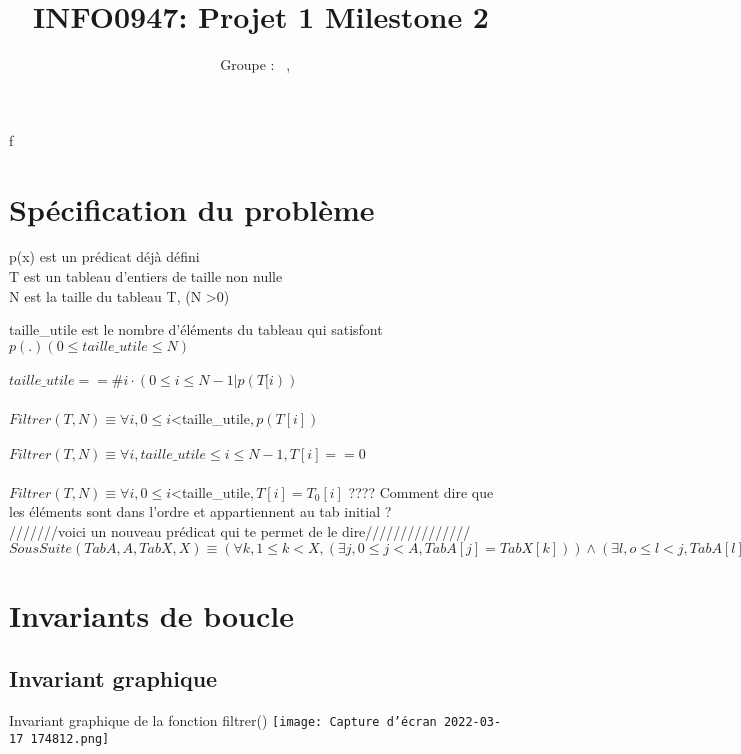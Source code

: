 f\documentclass[a4paper, 11pt, oneside]{article}
\title{INFO0947: Projet 1 Milestone 2}
\author{Groupe \GrNbr : \PrenomUN~\textsc{\NomUN}, \PrenomDEUX~\textsc{\NomDEUX}}
\date{}
\begin{document}
\maketitle


\section{Spécification du problème}


p(x) est un prédicat déjà défini 
\\
T est un tableau d'entiers de taille non nulle
\\
N est la taille du tableau T,  (N \textgreater 0)

taille\_utile est le nombre d'éléments du tableau qui satisfont $p(.) (0 \leq taille\_utile \leq N  )$
\\
\\
$taille\_utile == \#i \cdot (0\leq i \leq N - 1|  p(T[i))  $
\\
\\
$Filtrer(T, N)\equiv \forall i, 0 \leq i $\textless taille\_utile$, p(T[i])$\\
\\
$Filtrer(T, N)\equiv \forall i, taille\_utile \leq i \leq N-1, T[i] == 0$ \\
\\
$Filtrer(T, N)\equiv  \forall i, 0 \leq i $\textless taille\_utile$, T[i] = T_{0}[i]$ ???? Comment dire que les éléments sont dans l'ordre et appartiennent au tab initial ?
\\
///////voici un nouveau prédicat qui te permet de le dire///////////////
\\
$SousSuite(TabA, A, TabX, X)\equiv (\forall k, 1 \leq k < X, (\exists j, 0 \leq j<A, TabA[j]=TabX[k]))\land(\exists l, o \leq l < j, TabA[l]=TabX[k-1]) $




\section{Invariants de boucle }
\subsection{Invariant graphique}

\begin{wrapfigure}{Invariant graphique de la fonction filtrer()}
    \centering
\texttt{[image: Capture d’écran 2022-03-17 174812.png]}
\end{wrapfigure}
\end{document}
